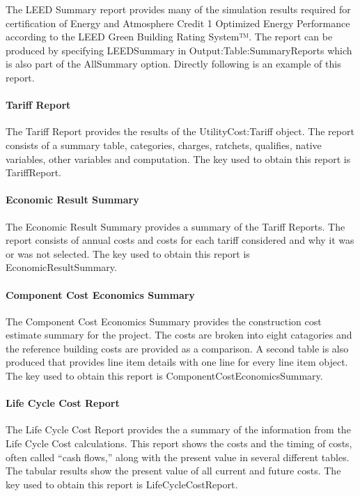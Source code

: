 The LEED Summary report provides many of the simulation results required for certification of Energy and Atmosphere Credit 1 Optimized Energy Performance according to the LEED Green Building Rating System™. The report can be produced by specifying LEEDSummary in Output:Table:SummaryReports which is also part of the AllSummary option. Directly following is an example of this report.

\paragraph{Tariff Report}\label{TariffReport}

The Tariff Report provides the results of the UtilityCost:Tariff object. The report consists of a summary table, categories, charges, ratchets, qualifies, native variables, other variables and computation. The key used to obtain this report is TariffReport.

\paragraph{Economic Result Summary}\label{EconomicResultSummary}

The Economic Result Summary provides a summary of the Tariff Reports. The report consists of annual costs and costs for each tariff considered and why it was or was not selected. The key used to obtain this report is EconomicResultSummary.

\paragraph{Component Cost Economics Summary}\label{component-cost-economics-summary}

The Component Cost Economics Summary provides the construction cost estimate summary for the project. The costs are broken into eight catagories and the reference building costs are provided as a comparison. A second table is also produced that provides line item details with one line for every line item object. The key used to obtain this report is ComponentCostEconomicsSummary.

\paragraph{Life Cycle Cost Report}\label{LifeCycleCostReport}

The Life Cycle Cost Report provides the a summary of the information from the Life Cycle Cost calculations.  This report shows the costs and the timing of costs, often called “cash flows,” along with the present value in several different tables. The tabular results show the present value of all current and future costs. The key used to obtain this report is LifeCycleCostReport.


